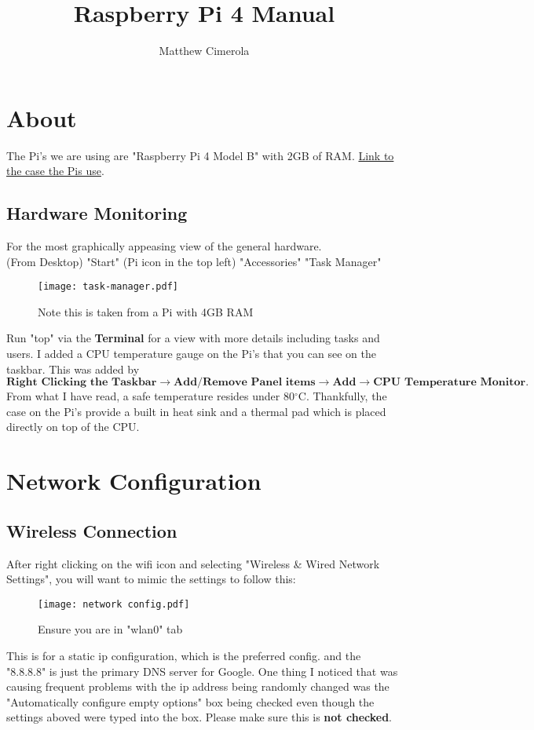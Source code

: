 \documentclass[12pt]{extarticle}
\author{Matthew Cimerola}
\title{Raspberry Pi 4 Manual}
\begin{document}
\maketitle

\tableofcontents
\newpage
\section{About}
The Pi's we are using are "Raspberry Pi 4 Model B" with 2GB of RAM. \href{https://www.amazon.com/Flirc-Raspberry-Pi-Case-Silver/dp/B07WG4DW52/ref=sr_1_5?keywords=Raspberry+Pi+4+Case&qid=1658852531&sr=8-5}{Link to the case the Pis use}. 
\subsection{Hardware Monitoring}
For the most graphically appeasing view of the general hardware.\\ 
(From Desktop) "Start" (Pi icon in the top left) \rightarrow "Accessories" \rightarrow "Task Manager" 

\begin{figure}[ht]
    \centering
    \texttt{[image: task-manager.pdf]}
    \caption{Note this is taken from a Pi with 4GB RAM}
\end{figure}
Run "top" via the \textbf{Terminal} for a view with more details including tasks and users. I added a CPU temperature gauge on the Pi's that you can see on the taskbar. This was added by $ \textbf{Right Clicking the Taskbar} \rightarrow \textbf{Add/Remove Panel items} \rightarrow \textbf{Add} \rightarrow \textbf{CPU Temperature Monitor}. $ From what I have read, a safe temperature resides under 80$^{\circ}$C. Thankfully, the case on the Pi's provide a built in heat sink and a thermal pad which is placed directly on top of the CPU.


\newpage
\section{Network Configuration}
\subsection{Wireless Connection}
After right clicking on the wifi icon and selecting "Wireless \& Wired Network Settings", you will want to mimic the settings to follow this: \\
\begin{figure}[ht]
    \centering
    \texttt{[image: network config.pdf]}
    \caption{Ensure you are in "wlan0" tab}
\end{figure}
This is for a static ip configuration, which is the preferred config. and the "8.8.8.8" is just the primary DNS server for Google. One thing I noticed that was causing frequent problems with the ip address being randomly changed was the "Automatically configure empty options" box being checked even though the settings aboved were typed into the box. Please make sure this is \textbf{not checked}.
\end{document}
